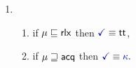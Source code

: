 \begin{minipage}{1.0\linewidth}
\begin{multicols}{2}
\begin{enumerate}[topsep=0pt,label=(\textsc{r}\arabic*),ref=\textsc{r}\arabic*]
      
    \item[] 
      \begin{enumerate}[leftmargin=0pt]
      \item \label{read-term-nonempty-ca}
        if $\mu\sqsubseteq{\mathsf{rlx}}$ then $\aTerm \riff \TRUE$,
      \item \label{read-term-empty-ca}
        if $\mu\sqsupseteq{\mathsf{acq}}$ then
        \begin{math}
          \aTerm \riff
          \kappaE{}. %
        \end{math}
      \end{enumerate}      
    \end{enumerate}

\end{multicols}
\end{minipage}
